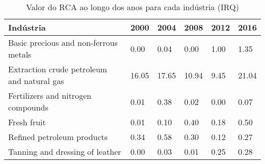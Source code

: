 \begin{table}
\centering
\caption{Valor do RCA ao longo dos anos para cada indústria (IRQ)}
\begin{tabular}{p{6cm}p{1.5cm}p{1.5cm}p{1.5cm}p{1.5cm}p{1.5cm}}
\toprule
                                 Indústria &  2000 &  2004 &  2008 & 2012 &  2016 \\
\midrule
     Basic precious and non-ferrous metals &  0.00 &  0.04 &  0.00 & 1.00 &  1.35 \\
Extraction crude petroleum and natural gas & 16.05 & 17.65 & 10.94 & 9.45 & 21.04 \\
        Fertilizers and nitrogen compounds &  0.01 &  0.38 &  0.02 & 0.00 &  0.07 \\
                               Fresh fruit &  0.01 &  0.10 &  0.40 & 0.18 &  0.50 \\
                Refined petroleum products &  0.34 &  0.58 &  0.30 & 0.12 &  0.27 \\
           Tanning and dressing of leather &  0.00 &  0.03 &  0.01 & 0.25 &  0.28 \\
\bottomrule
\end{tabular}
\end{table}
